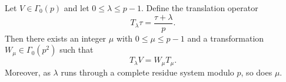 \begin{lemma}
\label{lem:gamma0p-coset-decomposition}
Let $V \in \Gamma_0(p)$ and let $0 \leq \lambda \leq p-1$. Define the translation operator
$$
T_\lambda \tau = \frac{\tau + \lambda}{p}.
$$
Then there exists an integer $\mu$ with $0 \leq \mu \leq p-1$ and a transformation $W_\mu \in \Gamma_0(p^2)$ such that
$$
T_\lambda V = W_\mu T_\mu.
$$
Moreover, as $\lambda$ runs through a complete residue system modulo $p$, so does $\mu$.
\end{lemma}
